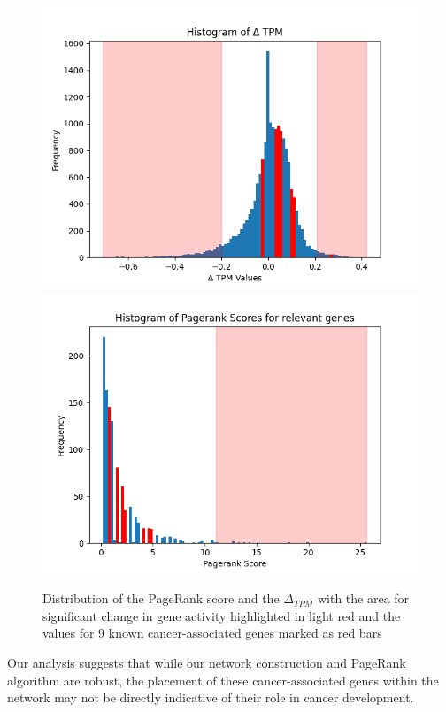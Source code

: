 \begin{figure}[h]
        \includegraphics[width=\linewidth]{figures/05_01_delta_tpm_relevant}
    \endminipage
    \hfill
      \includegraphics[width=\linewidth]{figures/05_01_pagerank_known_genes}
    \endminipage
    \caption{Distribution of the PageRank score and the $\Delta_{TPM}$
        with the area for significant change in gene activity highlighted in light red
        and the values for 9 known cancer-associated genes marked as red bars}
    \label{fig:05_known_genes}
\end{figure}

Our analysis suggests that while our network construction and PageRank algorithm are robust,
the placement of these cancer-associated genes within the network may not be directly indicative
of their role in cancer development.\\

